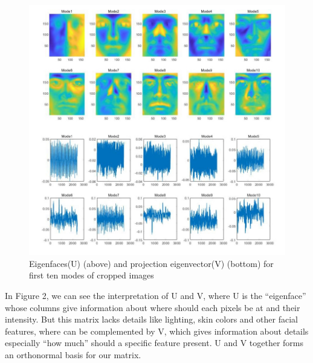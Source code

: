 \documentclass[11pt,a4paper]{article}
\numberwithin{equation}{subsection}
\begin{document}
\begin{figure}[H]
\begin{center}
\includegraphics[scale=0.40]{U1V1.jpg}
\caption{Eigenfaces(U) (above) and projection eigenvector(V) (bottom) for first ten modes of cropped images}
\end{center}
\end{figure}
In Figure 2, we can see the interpretation of U and V, where U is the ``eigenface'' whose columns give information about where should each pixels be at and their intensity. But this matrix lacks details like lighting, skin colors and other facial features, where can be complemented by V, which gives information about details especially ``how much'' should a specific feature present. U and V together forms an orthonormal basis for our matrix.
\end{document}
